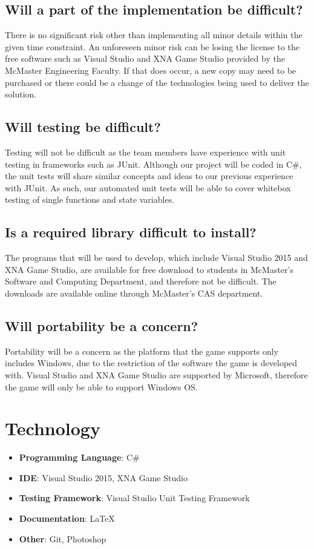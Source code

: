 \documentclass{article}
\begin{document}
\subsection*{Will a part of the implementation be difficult?}
There is no significant risk other than implementing all minor details within the given time constraint. An unforeseen minor risk can be losing the license to the free software such as Visual Studio and XNA Game Studio provided by the McMaster Engineering Faculty. If that does occur, a new copy may need to be purchased or there could be a change of the technologies being used to deliver the solution. \\
    
\subsection*{Will testing be difficult?}
Testing will not be difficult as the team members have experience with unit testing in frameworks such as JUnit. Although our project will be coded in C\#, the unit tests will share similar concepts and ideas to our previous experience with JUnit. As such, our automated unit tests will be able to cover whitebox testing of single functions and state variables. \\
    
\subsection*{Is a required library difficult to install?}
The programs that will be used to develop, which include Visual Studio 2015 and XNA Game Studio, are available for free download to students in McMaster's Software and Computing Department, and therefore not be difficult. The downloads are available online through McMaster's CAS department. \\

\subsection*{Will portability be a concern?}
Portability will be a concern as the platform that the game supports only includes Windows, due to the restriction of the software the game is developed with. Visual Studio and XNA Game Studio are supported by Microsoft, therefore the game will only be able to support Windows OS.
    
\section{Technology}
\begin{itemize}
    \item \textbf{Programming Language}: C\#
    \item \textbf{IDE}: Visual Studio 2015, XNA Game Studio
    \item \textbf{Testing Framework}: Visual Studio Unit Testing Framework
    \item \textbf{Documentation}: LaTeX
    \item \textbf{Other}: Git, Photoshop
\end{itemize}
	
\end{document}
